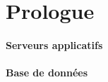 
\usepackage{float}




\section{Prologue}



\paragraph{Serveurs applicatifs}



\paragraph{Base de données}

\section{}



